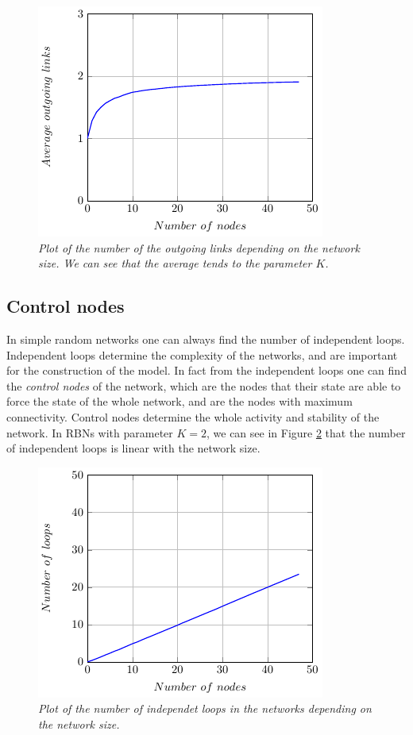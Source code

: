 \begin{figure}[h]
\centering
\includegraphics[scale=1.5]{images/outgoing.pdf}
\caption{\emph{Plot of the number of the outgoing links depending on the network size. We can see that the average tends to the parameter $K$. }}
\label{fig:outgoing}
\end{figure}



\subsection{Control nodes}
In simple random networks one can always find the number of independent loops.
Independent loops determine the complexity of the networks\cite{K38}, and are important for the construction of the model. In fact from the independent loops one can find the \emph{control nodes} of the network, which are the nodes that their state are able to force the state of the whole network, and are the nodes with maximum connectivity. Control nodes determine the whole activity and stability of the network. 
In RBNs with parameter $K=2$, we can see in Figure \ref{fig:loops} that the number of independent loops is linear with the network size.
\begin{figure}[h]
\centering
\includegraphics[scale=1.5]{images/loops.pdf}
\caption{\emph{Plot of the number of independet loops in the networks depending on the network size.}}
\label{fig:loops}
\end{figure}


